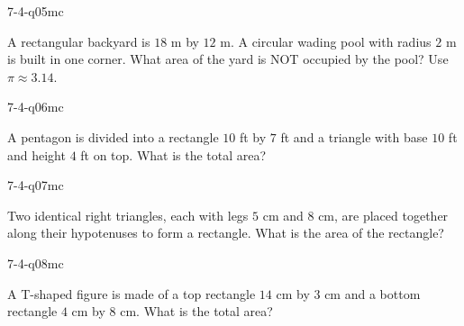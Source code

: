 \begin{practiceQuestion}{7-4-q05}{mc}
\begin{questionText}
A rectangular backyard is $18$ m by $12$ m. A circular wading pool with radius $2$ m is built in one corner. What area of the yard is NOT occupied by the pool? Use $\pi \approx 3.14$.
\end{questionText}
\end{practiceQuestion}

\begin{practiceQuestion}{7-4-q06}{mc}
\begin{questionText}
A pentagon is divided into a rectangle $10$ ft by $7$ ft and a triangle with base $10$ ft and height $4$ ft on top. What is the total area?
\end{questionText}
\end{practiceQuestion}

\begin{practiceQuestion}{7-4-q07}{mc}
\begin{questionText}
Two identical right triangles, each with legs $5$ cm and $8$ cm, are placed together along their hypotenuses to form a rectangle. What is the area of the rectangle?
\end{questionText}
\end{practiceQuestion}

\begin{practiceQuestion}{7-4-q08}{mc}
\begin{questionText}
A T-shaped figure is made of a top rectangle $14$ cm by $3$ cm and a bottom rectangle $4$ cm by $8$ cm. What is the total area?
\end{questionText}
\end{practiceQuestion}

